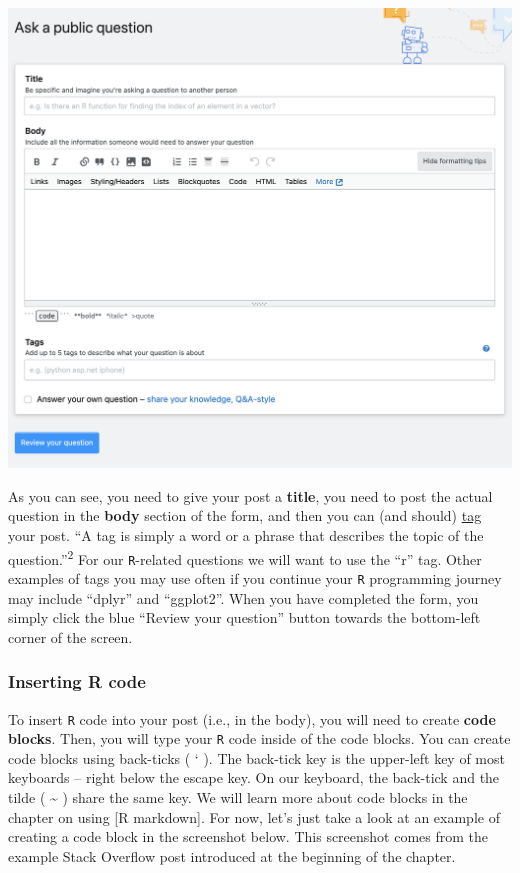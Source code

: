 \documentclass[
  letterpaper,
  DIV=11,
  numbers=noendperiod]{scrreprt}
\begin{document}
\includegraphics{chapters/asking_questions/so_2.png}

As you can see, you need to give your post a \textbf{title}, you need to
post the actual question in the \textbf{body} section of the form, and
then you can (and should)
\href{https://stackoverflow.com/help/tagging}{tag} your post. ``A tag is
simply a word or a phrase that describes the topic of the
question.''\textsuperscript{2} For our \texttt{R}-related questions we
will want to use the ``r'' tag. Other examples of tags you may use often
if you continue your \texttt{R} programming journey may include
``dplyr'' and ``ggplot2''. When you have completed the form, you simply
click the blue ``Review your question'' button towards the bottom-left
corner of the screen.

\subsubsection{Inserting R code}\label{inserting-r-code}

To insert \texttt{R} code into your post (i.e., in the body), you will
need to create \textbf{code blocks}. Then, you will type your \texttt{R}
code inside of the code blocks. You can create code blocks using
back-ticks ( ` ). The back-tick key is the upper-left key of most
keyboards -- right below the escape key. On our keyboard, the back-tick
and the tilde ( \textasciitilde{} ) share the same key. We will learn
more about code blocks in the chapter on using {[}R markdown{]}. For
now, let's just take a look at an example of creating a code block in
the screenshot below. This screenshot comes from the example Stack
Overflow post introduced at the beginning of the chapter.
\end{document}
